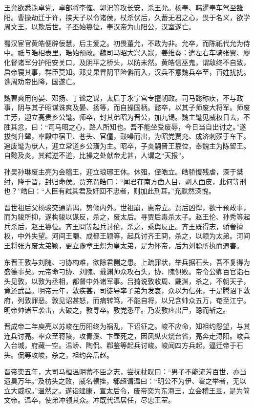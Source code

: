 \documentclass[a4paper,12pt,UTF8,twoside]{ctexbook}
\begin{document}
    王允欲悉诛卓党，卓部将李傕、郭汜等攻长安，杀王允。杨奉、韩暹奉车驾至雒阳。曹操劫迁于许，挟天子以令诸侯，杖杀伏后，久蓄无君之心，畏于名义，欲学周文王，以欺后世。子丕始篡位，奉汉帝为山阳公，汉室遂亡。
    
    蜀汉宦官黄皓便辟佞慧，后主爱之。初畏董允，不敢为非。允卒，而陈祇代允为侍中。祇与皓相表里，皓始预政。魏司马昭大兴入寇，姜维奏：遣左右车骑张翼、廖化督诸军分护阳安关口，及阴平之桥头，以防未然。黄皓信巫鬼，谓敌终不自致，启帝寝其事，群臣莫知。邓艾果冒阴平险僻而入，汉兵不意魏兵卒至，百姓扰扰。谯周劝帝出降，国遂亡。
    
    魏曹爽用何晏、邓扬、丁谧之谋，太后于永宁宫专擅朝政。司马懿称疾，不与政事，阴与其子昭谋诛爽及晏、扬等，而自操国柄。懿卒，以其子师废大将军。师废主芳，迎立高贵乡公髦。师卒，封其弟昭为晋公，加九锡。魏主髦见威权日去，不胜其忿，曰：“司马昭之心，路人所知也。吾不能坐受废辱，今日当自出讨之。”遂拔剑升辇，率殿中宿卫、苍头、官僮，鼓噪而出，为昭党贾充、成济刺殒于车下。追废髦为庶人，迎立常道乡公璜为主。昭卒，子炎嗣晋王篡位，奉魏主为陈留王。自懿及炎，其弒逆不道，比操之处献帝尤甚，人谓之“天报”。
    
    孙吴孙琳废主亮为会稽王，迎立琅琊王休。休殂，侄皓立。皓骄愎残虐，深于桀纣，降于晋，封归命侯。贾充谓皓曰：“闻君在南方凿人目，剥人面皮，此何等刑也？”皓曰：“人臣有弒其君及奸回不忠者，则加此刑耳。”充默然深愧。
    
    晋世祖后父杨骏交通请谒，势倾内外。世祖崩，惠帝立。贾后凶悍，欲干预政事，而为骏所抑，遂构骏以谋反，杀之，废太后。寻贾后毒杀太子。赵王伦、孙秀等起兵杀后，赵王篡位。齐王冏等起兵讨伦，杀之，乘舆反正。齐王既得志，骄奢擅权，中外失望。河间王颙、成都王颖等，起兵讨齐王冏，杀之，以颖为太弟。河间王将张方废太弟颖，更立豫章王炽为皇太弟，是为怀帝，后为刘聪所执而遇害。
    
    东晋王敦与刘隗、刁协构难，欲除君侧之患。上疏罪状，举兵据石头，吾不复得为盛德事矣。元帝命刁协、刘隗、戴渊帅众攻石头，协、隗俱败。帝令公卿百官诣石头见敦，以敦为丞相，都督中外诸军事。吕猗说敦收周、戴渊，杀之，不朝天子，竟还武昌。明帝元年，敦疾甚，司徒导率子弟为发哀，众以为信死，于是腾诏下敦府，列敦罪恶。敦见诏甚怒，而病转笃，不能自将，以兄含帅众五万，奄至江宁。明帝帅诸军袭击，大破之，敦寻卒。敦党悉平。乃发敦瘗出尸，跽而斩之。
    
    晋成帝二年庾亮以苏峻在历阳终为祸乱，下诏征之。峻不应命，知祖约怨望，与其连兵讨亮。率众至蒋陵，攻青溪、卞壶死之，因风纵火烧台省，亮奔走浔阳。峻兵入台城，府藏一空。温峤、陶侃、郗鉴等起兵讨峻。峻闻四方兵起，逼迁帝于石头。侃等攻峻，杀之，祖约奔后赵。
    
    晋帝奕五年，大司马桓温阴蓄不臣之志，尝抚枕叹曰：“男子不能流芳百世，亦当遗臭万年。”及枋头之败，威名顿挫，郗超谓温曰：“明公不为伊、霍之举者，无以立大威权。”温然之。遂诣建康，宣太后令，废帝奕为东海王，立会稽王昱，是为简文帝。温卒，使弟冲领其众。冲既代温居任，尽忠王室。
    
\end{document}
